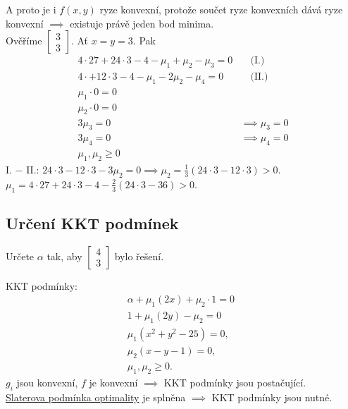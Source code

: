 A proto je i $f(x, y)$ ryze konvexní, protože součet ryze konvexních dává ryze konvexní $\implies$ existuje právě jeden 
bod minima.\\
Ověříme $\begin{bmatrix} 3 \\ 3 \end{bmatrix}$. Ať $x=y=3$. Pak
\begin{align*}
    4 \cdot 27 + 24 \cdot 3 - 4 - \mu_1 + \mu_2 - \mu_3 = 0& \quad \text{(I.)} \\
    4 \cdot + 12 \cdot 3 - 4 - \mu_1 - 2\mu_2 - \mu_4 = 0& \quad \text{(II.)}\\
    \mu_1 \cdot 0 = 0& \\
    \mu_2 \cdot 0 = 0& \\
    3 \mu_3 = 0& \implies \mu_3 = 0\\
    3 \mu_4 = 0& \implies \mu_4 = 0\\
    \mu_1, \mu_2 \geq 0&
\end{align*}
I. $-$ II.: $24 \cdot 3 - 12 \cdot 3 - 3 \mu_2 = 0 \implies \mu_2 = \frac{1}{3} (24 \cdot 3 - 12 \cdot 3) > 0$.\\
$\mu_1 = 4 \cdot 27 + 24 \cdot 3 - 4 - \frac{2}{3}(24 \cdot 3 - 36) > 0$.

\subsection{Určení KKT podmínek}
Určete $\alpha$ tak, aby 
$\begin{bmatrix}
    4 \\
    3
\end{bmatrix}$ bylo řešení.

KKT podmínky:
\begin{align*}
    \alpha + \mu_1 (2x) + \mu_2 \cdot 1 = 0\phantom{,} \\
    1 + \mu_1 (2y) - \mu_2 = 0\phantom{,} \\
    \mu_1(x^2 + y^2 - 25) = 0, \\
    \mu_2(x - y - 1) = 0, \\
    \mu_1, \mu_2 \geq 0.
\end{align*}
$g_i$ jsou konvexní, $f$ je konvexní $\implies$ KKT podmínky jsou postačující.\\
\hyperref[slaterPodm]{Slaterova podmínka optimality} je splněna $\implies$ KKT podmínky jsou nutné.

